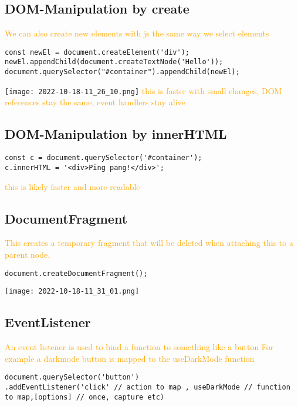 \documentclass[main.tex,fontsize=6pt,paper=a4,paper=landscape,DIV=calc,]{scrartcl}
\begin{document}
\begin{multicols*}{4}
\subsection{DOM-Manipulation by create}  
\textcolor{orange}{We can also create new elements with js the same way we select elements}
\vspace{-2mm}
\begin{lstlisting}
const newEl = document.createElement('div');
newEl.appendChild(document.createTextNode('Hello'));
document.querySelector("#container").appendChild(newEl);
\end{lstlisting}
\vspace{2mm}
\texttt{[image: 2022-10-18-11\_26\_10.png]}\newline 
\textcolor{orange}{this is faster with small changes, DOM references stay the same, event handlers stay alive}

\subsection{DOM-Manipulation by innerHTML}  
\vspace{-2mm}
\begin{lstlisting}
const c = document.querySelector('#container');
c.innerHTML = '<div>Ping pang!</div>';
\end{lstlisting}
\vspace{2mm}
\textcolor{orange}{this is likely faster and more readable}
 
\subsection{DocumentFragment}  
\textcolor{orange}{This creates a temporary fragment that will be deleted when attaching this to a parent node.}
\vspace{-2mm}
\begin{lstlisting}
document.createDocumentFragment();
\end{lstlisting}
\vspace{2mm}
\texttt{[image: 2022-10-18-11\_31\_01.png]}

\subsection{EventListener}  
\textcolor{orange}{An event listener is used to bind a function to something like a button\newline
For example a darkmode button is mapped to the useDarkMode function}
\vspace{-2mm}
\begin{lstlisting}
document.querySelector('button')
.addEventListener('click' // action to map , useDarkMode // function to map,[options] // once, capture etc)
\end{lstlisting}
\vspace{2mm}



\end{multicols*}
\end{document}
